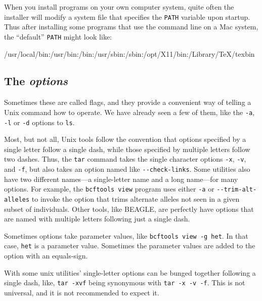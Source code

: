 \documentclass[]{krantz}
\makeatletter
\newenvironment{Shaded}{\begin{snugshade}}{\end{snugshade}}
\newcommand{\ExtensionTok}[1]{#1}
\newcommand{\NormalTok}[1]{#1}
\newenvironment{kframe}{%
\medskip{}
\setlength{\fboxsep}{.8em}
 \def\at@end@of@kframe{}%
 \ifinner\ifhmode%
  \def\at@end@of@kframe{\end{minipage}}%
  \begin{minipage}{\columnwidth}%
 \fi\fi%
 \def\FrameCommand##1{\hskip\@totalleftmargin \hskip-\fboxsep
 \colorbox{shadecolor}{##1}\hskip-\fboxsep
     \hskip-\linewidth \hskip-\@totalleftmargin \hskip\columnwidth}%
 \MakeFramed {\advance\hsize-\width
   \@totalleftmargin\z@ \linewidth\hsize
   \@setminipage}}%
 {\par\unskip\endMakeFramed%
 \at@end@of@kframe}
\renewenvironment{Shaded}{\begin{kframe}}{\end{kframe}}
\makeatother
\begin{document}
When you install programs on your own computer system, quite often the installer will modify
a system file that specifies the \texttt{PATH} variable upon startup. Thus after installing some
programs that use the command line on a Mac system, the ``default'' \texttt{PATH} might look like:

\begin{Shaded}
\begin{Highlighting}[]
\ExtensionTok{/usr/local}\NormalTok{/bin:}\ExtensionTok{/usr}\NormalTok{/bin:/bin:}\ExtensionTok{/usr}\NormalTok{/sbin:/sbin:}\ExtensionTok{/opt/X11}\NormalTok{/bin:}\ExtensionTok{/Library/TeX/texbin}
\end{Highlighting}
\end{Shaded}

\hypertarget{the-options}{%
\subsection{\texorpdfstring{The \emph{options}}{The options}}\label{the-options}}

Sometimes these are called flags, and they provide a convenient way of
telling a Unix command how to operate. We have already seen a few of them,
like the \texttt{-a}, \texttt{-l} or \texttt{-d} options to \texttt{ls}.

Most, but not all, Unix tools follow the convention that options specified by a single
letter follow a single dash, while those specified by multiple letters follow two dashes.
Thus, the \texttt{tar} command takes the single character options \texttt{-x}, \texttt{-v}, and \texttt{-f}, but also takes
an option named like \texttt{-\/-check-links}. Some utilities also have two different names---a single-letter
name and a long name---for many options.
For example, the \texttt{bcftools\ view} program uses either \texttt{-a} or \texttt{-\/-trim-alt-alleles} to invoke the option
that trims alternate alleles not seen in a given subset of individuals. Other tools, like BEAGLE, are perfectly
have options that are named with multiple letters following just a single dash.

Sometimes options take parameter values, like \texttt{bcftools\ view\ -g\ het}. In that case, \texttt{het} is
a parameter value. Sometimes the parameter values are added to the option with an equals-sign.

With some unix utilities' single-letter options can be bunged together
following a single dash, like, \texttt{tar\ -xvf} being synonymous with \texttt{tar\ -x\ -v\ -f}. This
is not universal, and it is not recommended to expect it.
\end{document}

